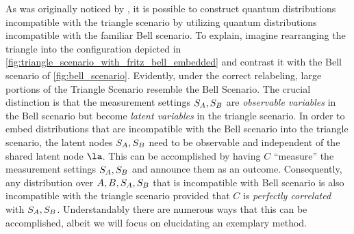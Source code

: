 \documentclass[aps, 10pt, english, twoside, pra, nofootinbib, tightenlines, longbibliography]{revtex4-1}
\begin{document}
    As was originally noticed by \citet{Fritz_2012}, it is possible to construct quantum distributions incompatible with the triangle scenario by utilizing quantum distributions incompatible with the familiar Bell scenario. To explain, imagine rearranging the triangle into the configuration depicted in \cref{fig:triangle_scenario_with_fritz_bell_embedded} and contrast it with the Bell scenario of \cref{fig:bell_scenario}. Evidently, under the correct relabeling, large portions of the Triangle Scenario resemble the Bell Scenario. The crucial distinction is that the measurement settings $S_{A}, S_{B}$ are \textit{observable variables} in the Bell scenario but become \textit{latent variables} in the triangle scenario. In order to embed distributions that are incompatible with the Bell scenario into the triangle scenario, the latent nodes $S_{A}, S_{B}$ need to be observable and independent of the shared latent node $\la$. This can be accomplished by having $C$ ``measure'' the measurement settings $S_{A}, S_{B}$ and announce them as an outcome. Consequently, any distribution over $A, B, S_{A}, S_{B}$ that is incompatible with Bell scenario is also incompatible with the triangle scenario provided that $C$ is \textit{perfectly correlated} with $S_{A}, S_{B}$. Understandably there are numerous ways that this can be accomplished, albeit we will focus on elucidating an exemplary method.
\end{document}
